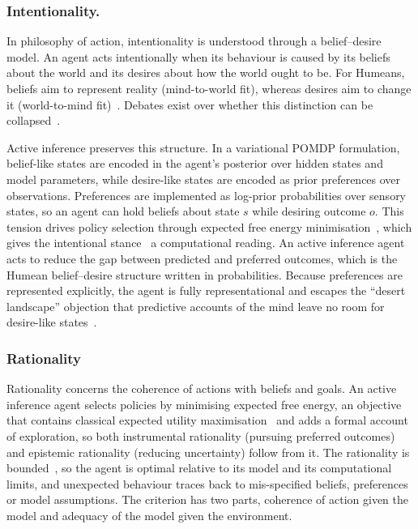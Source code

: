 \documentclass[pdflatex,sn-apa]{sn-jnl}%
\theoremstyle{definition}
\begin{document}
\subsubsection{Intentionality.}
In philosophy of action, intentionality is understood through a belief--desire model. An agent acts intentionally when its behaviour is caused by its beliefs about the world and its desires about how the world ought to be. For Humeans, beliefs aim to represent reality (mind-to-world fit), whereas desires aim to change it (world-to-mind fit)~\citep{smithHumeanTheoryMotivation1987}. Debates exist over whether this distinction can be collapsed~\citep{junker2024predictive}.

Active inference preserves this structure. In a variational POMDP formulation, belief-like states are encoded in the agent's posterior over hidden states and model parameters, while desire-like states are encoded as prior preferences over observations. Preferences are implemented as log-prior probabilities over sensory states, so an agent can hold beliefs about state $s$ while desiring outcome $o$. This tension drives policy selection through expected free energy minimisation~\citep{parrActiveInferenceFree2022a}, which gives the intentional stance~\citep{dennettIntentionalStance1987} a computational reading. An active inference agent acts to reduce the gap between predicted and preferred outcomes, which is the Humean belief--desire structure written in probabilities. Because preferences are represented explicitly, the agent is fully representational and escapes the ``desert landscape'' objection that predictive accounts of the mind leave no room for desire-like states~\citep{williamsDesertLandscape2018}.

\subsubsection{Rationality}
Rationality concerns the coherence of actions with beliefs and goals. An active inference agent selects policies by minimising expected free energy, an objective that contains classical expected utility maximisation~\citep{dacostaRewardMaximizationDiscrete2023} and adds a formal account of exploration, so both instrumental rationality (pursuing preferred outcomes) and epistemic rationality (reducing uncertainty) follow from it. The rationality is bounded~\citep{simonModelsMan1957,ortegaThermodynamicsFreeEnergy2013}, so the agent is optimal relative to its model and its computational limits, and unexpected behaviour traces back to mis-specified beliefs, preferences or model assumptions. The criterion has two parts, coherence of action given the model and adequacy of the model given the environment.
\end{document}
